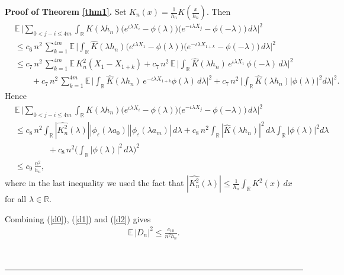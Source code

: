\documentclass[11pt]{article}
\newenvironment{proof}[1][Proof]{\textbf{#1.} }{\
\rule{0.5em}{0.5em}}
\def\R{{\mathbb R}}
\def\E{{{\mathbb E}\,}}
\begin{document}
\begin{proof}[Proof of Theorem \ref{thm1}]
Set $K_n(x)=\frac{1}{h_n}K(\frac{x}{h_n})$. Then
\begin{align*}
&\E \Big|\sum_{0<j-i\leq 4m}\int_{\R} \widehat{K}(\lambda h_n)\big(e^{\iota \lambda  X_i}- \phi(\lambda)\big)\big(e^{-\iota \lambda  X_j}-\phi(-\lambda)\big) \, d\lambda \Big|^2 \nonumber \\
&\leq c_6\, n^2\, \sum^{4m}_{k=1} \E \Big|\int_{\R} \widehat{K}(\lambda h_n)\big(e^{\iota \lambda  X_1}- \phi(\lambda)\big)\big(e^{-\iota \lambda  X_{1+k}}-\phi(-\lambda)\big) \, d\lambda\Big|^2 \nonumber \\
&\leq c_7\, n^2\, \sum^{4m}_{k=1}\E K^2_n(X_1-X_{1+k})+ c_7\,n^2\,\E\Big|\int_{\R} \widehat{K}(\lambda h_n)\, e^{\iota \lambda  X_1}\, \phi(-\lambda)\, d\lambda\Big|^2 \nonumber \\
&\qquad+ c_7\, n^2\,\sum^{4m}_{k=1}\E\Big|\int_{\R} \widehat{K}(\lambda h_n)\, e^{-\iota \lambda  X_{1+k}}\phi(\lambda) \, d\lambda \Big|^2+c_7\,n^2\,\Big| \int_{\R}\widehat{K}(\lambda h_n)|\phi(\lambda)|^2 d\lambda \Big|^2.
\end{align*}
Hence
\begin{align}\label{d2}
&\E \Big|\sum_{0<j-i\leq 4m}\int_{\R} \widehat{K}(\lambda h_n)\big(e^{\iota \lambda  X_i}- \phi(\lambda)\big)\big(e^{-\iota \lambda  X_j}-\phi(-\lambda)\big) \, d\lambda \Big|^2 \nonumber \\
&\leq c_8\, n^2\int_{\R} |\widehat{K^2_n}(\lambda)| |\phi_{\varepsilon}(\lambda a_0)| |\phi_{\varepsilon}(\lambda a_m)|\, d\lambda+ c_8\, n^2 \int_{\R} |\widehat{K}(\lambda h_n)|^2\, d\lambda \int_{\R}|\phi(\lambda)|^2 d\lambda \nonumber\\
&\qquad\qquad+c_8\, n^2 \Big(\int_{\R} |\phi(\lambda)|^2\, d\lambda\Big)^2  \nonumber \\
&\leq c_9\, \frac{n^2}{h_n},
\end{align}
where in the last inequality we used the fact that $|\widehat{K^2_n}(\lambda)|\leq \frac{1}{h_n}\int_{\R} K^2(x)\, dx$ for all $\lambda\in\R$.

Combining (\ref{d0}), (\ref{d1}) and (\ref{d2}) gives
\begin{align*}
\E|D_n|^2 \leq \frac{c_{10}}{n^2 h_n}. 
\end{align*}


\end{proof}
\end{document}
